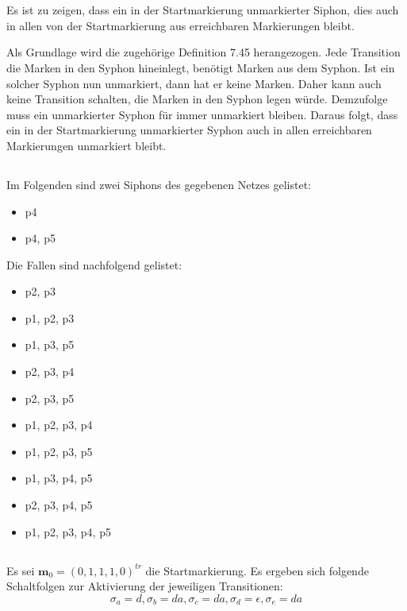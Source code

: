 \documentclass[10pt,a4paper,oneside,ngerman,numbers=noenddot]{scrartcl}
\begin{document}
\section{} %
\subsection{}
Es ist zu zeigen, dass ein in der Startmarkierung unmarkierter Siphon, dies auch in allen von der Startmarkierung aus erreichbaren Markierungen bleibt.

Als Grundlage wird die zugehörige Definition 7.45 herangezogen. Jede Transition die Marken in den Syphon hineinlegt, benötigt Marken aus dem Syphon. Ist ein solcher Syphon nun unmarkiert, dann hat er keine Marken. Daher kann auch keine Transition schalten, die Marken in den Syphon legen würde. Demzufolge muss ein unmarkierter Syphon für immer unmarkiert bleiben. Daraus folgt, dass ein in der Startmarkierung unmarkierter Syphon auch in allen erreichbaren Markierungen unmarkiert bleibt.

\subsection{}
Im Folgenden sind zwei Siphons des gegebenen Netzes gelistet:
\begin{itemize}
	\item p4
	\item p4, p5
\end{itemize}

Die Fallen sind nachfolgend gelistet:
\begin{itemize}
	\item p2, p3
	\item p1, p2, p3
	\item p1, p3, p5
	\item p2, p3, p4
	\item p2, p3, p5
	\item p1, p2, p3, p4
	\item p1, p2, p3, p5	
	\item p1, p3, p4, p5
	\item p2, p3, p4, p5
	\item p1, p2, p3, p4, p5
\end{itemize}

\subsection{}
Es sei \(\textbf{m}_0 = (0, 1, 1, 1, 0)^{tr}\) die Startmarkierung. Es ergeben sich folgende Schaltfolgen zur Aktivierung der jeweiligen Transitionen:
\[
	\sigma_a = d, \sigma_b = da, \sigma_c = da, \sigma_d = \epsilon, \sigma_e = da
\]
\end{document}
